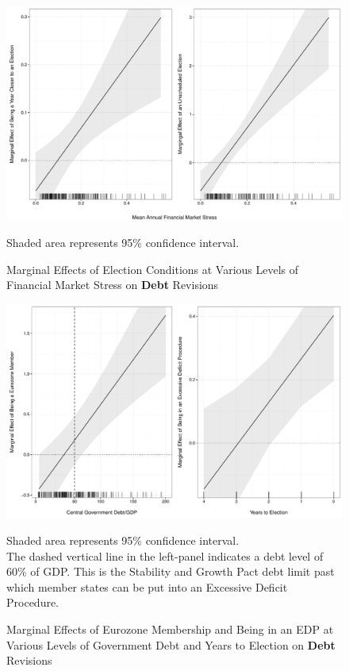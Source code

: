\documentclass[]{article}
\begin{document}
\begin{figure}
    \caption{Marginal Effects of Election Conditions at Various Levels of Financial Market Stress on \textbf{Debt} Revisions}
    \label{me_finstress_elect}

    \begin{center}
        \includegraphics[scale=0.45]{figures/fsi_elect_me.pdf}
    \end{center}

	{\scriptsize{Shaded area represents 95\% confidence interval.}}

\end{figure}

\begin{figure}
    \caption{Marginal Effects of Eurozone Membership and Being in an EDP at Various Levels of Government Debt and Years to Election on \textbf{Debt} Revisions}
    \label{me_debt_edp_elect}

    \begin{center}
        \includegraphics[scale=0.45]{figures/edp_debt_elect_me.pdf}
    \end{center}

	{\scriptsize{Shaded area represents 95\% confidence interval.\\
    The dashed vertical line in the left-panel indicates a debt level of 60\% of GDP. This is the Stability and Growth Pact debt limit past which member states can be put into an Excessive Deficit Procedure.}}

\end{figure}
\end{document}
